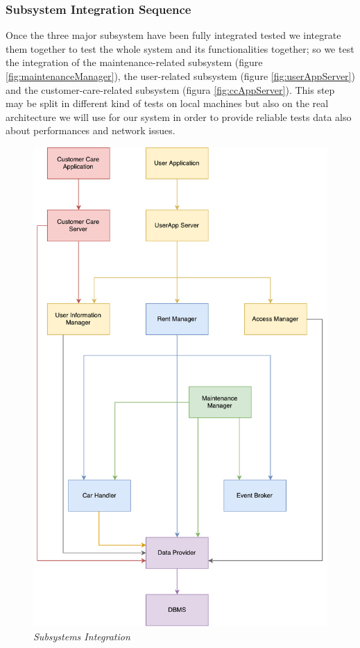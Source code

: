 \clearpage 

\subsubsection{Subsystem Integration Sequence}
Once the three major subsystem have been fully integrated tested we integrate them together to test the whole system and its functionalities together; so we test the integration of the maintenance-related subsystem (figure \ref{fig:maintenanceManager}), the user-related subsystem (figure \ref{fig:userAppServer}) and the customer-care-related subsystem (figura \ref{fig:ccAppServer}).
This step may be split in different kind of tests on local machines but also on the real architecture we will use for our system in order to provide reliable tests data also about performances and network issues.

	\begin{figure}[h]
			\centering
			\includegraphics[width=0.7\linewidth]{img/subsystemIntegration}
			\caption{
				\label{fig:subsystemIntegration} 
				\emph{Subsystems Integration}
			}
		\end{figure}
